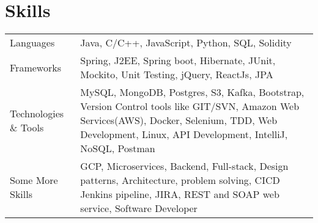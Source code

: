 \documentclass[a4paper,10pt]{article}
\newcommand{\customHeading}[1]{
    \section{\texorpdfstring{#1 \hrulefill}{}}
}
\begin{document}
\customHeading{Skills}
\begin{tabularx}{\linewidth}{@{}l X@{}}
Languages &  \normalsize{Java, C/C++, JavaScript, Python, SQL, Solidity}\\

Frameworks  &  \normalsize{Spring, J2EE, Spring boot, Hibernate, JUnit, Mockito, Unit Testing, jQuery, ReactJs, JPA}\\ 

Technologies \& Tools  &  \normalsize{MySQL, MongoDB, Postgres, S3, Kafka, Bootstrap,
Version Control tools like GIT/SVN, Amazon Web Services(AWS), Docker, Selenium, TDD,  Web Development, Linux, API Development, IntelliJ, NoSQL, Postman}\\  

Some More Skills  &  \normalsize{GCP, Microservices, Backend, Full-stack, Design patterns, Architecture, problem solving, CICD Jenkins pipeline, JIRA, REST and SOAP web service, Software Developer}\\  
\end{tabularx}
\end{document}
